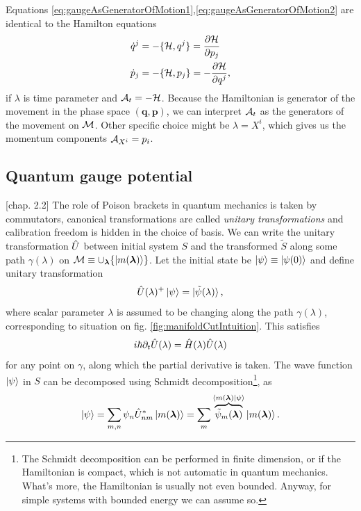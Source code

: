 Equations \ref{eq:gaugeAsGeneratorOfMotion1},\ref{eq:gaugeAsGeneratorOfMotion2} are identical to the Hamilton equations
\begin{equation}
\begin{split}
    \dot{q}^j&=-\{\mathcal{H},q^j\} = \frac{\partial \mathcal{H}}{\partial p_j}\\
    \dot{p}_j&=-\{\mathcal{H},p_j\} = -\frac{\partial \mathcal{H}}{\partial q^j},
\end{split}
\end{equation}
if $\lambda$ is time parameter and $\mathcal{A}_t=-\mathcal{H}$. Because the Hamiltonian is generator of the movement in the phase space $(\bm{q},\bm{p})$, we can interpret $\mathcal{A}_t$ as the generators of the movement on $\mathcal{M}$. Other specific choice might be $\lambda=X^i$, which gives us the momentum components $\mathcal{A}_{X^i}=p_i$.




\subsection{Quantum gauge potential}
\citep{kolodrubez}[chap. 2.2]
The role of Poison brackets in quantum mechanics is taken by commutators, canonical transformations are called \emph{unitary transformations} and calibration freedom is hidden in the choice of basis. We can write the unitary transformation $\hat{U}$ between initial system $S$ and the transformed $\tilde{S}$ along some path $\gamma(\lambda)$ on $\mathcal{M}\equiv \cup_{\bm\lambda} \{\ket{m({\bm\lambda})}\}$. Let the initial state be $\ket{\psi}\equiv \ket{\psi(0)}$ and define unitary transformation
\begin{equation}
    \hat{U}(\lambda)^+ \ket{\psi}=\ket{\tilde\psi(\lambda)},
    \label{eq:transformationU}
\end{equation}
where scalar parameter $\lambda$ is assumed to be changing along the path $\gamma(\lambda)$, corresponding to situation on fig. \ref{fig:manifoldCutIntuition}. This satisfies
\begin{equation}
    i\hbar \partial_t \hat{U}(\lambda)=\hat{H}(\lambda)\hat{U}(\lambda)
\end{equation}
for any point on $\gamma$, along which the partial derivative is taken.
The wave function $\ket{\psi}$ in $S$ can be decomposed using Schmidt decomposition\footnote{The Schmidt decomposition can be performed in finite dimension, or if the Hamiltonian is compact, which is not automatic in quantum mechanics. What's more, the Hamiltonian is usually not even bounded. Anyway, for simple systems with bounded energy we can assume so.}, as
\begin{equation}
    \ket{\psi} = \sum_{m,n}\psi_n \hat{U}_{nm}^*\ket{m({\bm\lambda})} = \sum_m \overbrace{\tilde{\psi}_m({\bm\lambda})}^{\braket{m({\bm\lambda})|\psi}}\ket{m({\bm\lambda})}.
\end{equation}
